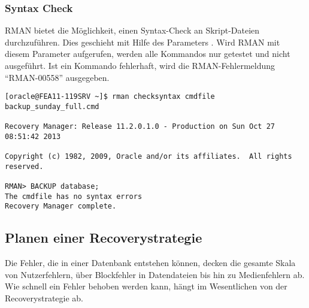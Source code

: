         \subsubsection{Syntax Check}
          RMAN bietet die Möglichkeit, einen Syntax-Check an Skript-Dateien durchzuführen. Dies geschieht mit Hilfe des Parameters . Wird RMAN mit diesem Parameter aufgerufen, werden alle Kommandos nur getestet und nicht ausgeführt. Ist ein Kommando fehlerhaft, wird die RMAN-Fehlermeldung \enquote{RMAN-00558} ausgegeben.
          \begin{lstlisting}[caption={Ein RMAN-Skript auf korrekte Syntax überprüfen},label=admin1362,language=rman]
[oracle@FEA11-119SRV ~]$ rman checksyntax cmdfile backup_sunday_full.cmd

Recovery Manager: Release 11.2.0.1.0 - Production on Sun Oct 27 08:51:42 2013

Copyright (c) 1982, 2009, Oracle and/or its affiliates.  All rights reserved.

RMAN> BACKUP database;
The cmdfile has no syntax errors
Recovery Manager complete.
          \end{lstlisting}
      \subsection{Planen einer Recoverystrategie}
        Die Fehler, die in einer Datenbank entstehen können, decken die
        gesamte Skala von Nutzer\-fehlern, über Blockfehler in Datendateien
        bis hin zu Medienfehlern ab. Wie schnell ein Fehler behoben
        werden kann, hängt im Wesentlichen von der Recoverystrategie ab.

